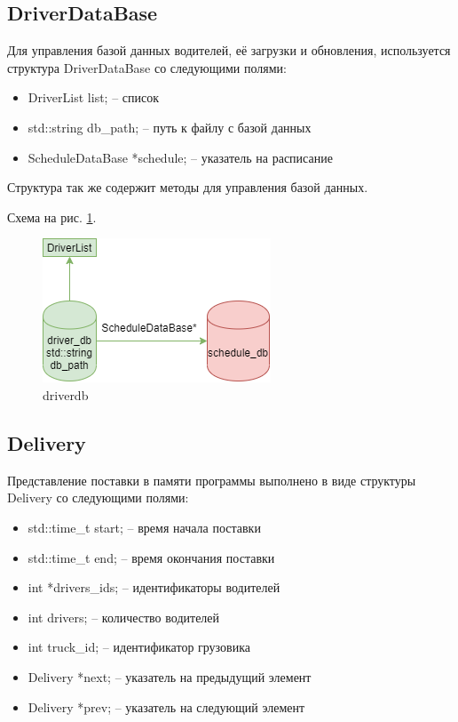 \subsection{DriverDataBase}

Для управления базой данных водителей, 
её загрузки и обновления, 
используется структура DriverDataBase со следующими полями: 

\begin{itemize}
    \item DriverList list{}; -- список
    \item std::string db\_path{}; -- путь к файлу с базой данных
    \item ScheduleDataBase *schedule{}; -- указатель на расписание
\end{itemize}

Структура так же содержит методы для управления базой данных.

Схема на рис. \ref{driver_db}.

\begin{figure}[hpt!]
    \centering
    \includegraphics[width=0.4\linewidth]{photo/driver_db}
    \caption{driverdb}
    \label{driver_db}
\end{figure}

\subsection{Delivery}

Представление поставки в памяти программы выполнено в виде структуры Delivery со следующими полями:

\begin{itemize}
    \item std::time\_t start{}; -- время начала поставки
    \item std::time\_t end{}; -- время окончания поставки
    \item int *drivers\_ids{}; -- идентификаторы водителей
    \item int drivers{}; -- количество водителей
    \item int truck\_id{}; -- идентификатор грузовика
    \item Delivery *next{}; -- указатель на предыдущий элемент
    \item Delivery *prev{}; -- указатель на следующий элемент
\end{itemize}

